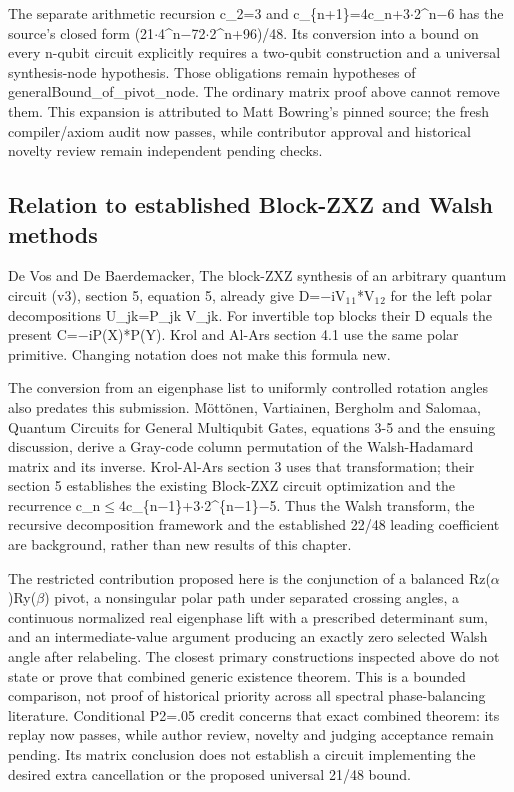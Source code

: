 \documentclass[11pt,a4paper]{article}
\begin{document}
The separate arithmetic recursion c\_2=3 and c\_\{n+1\}=4c\_n+3\ensuremath{\cdot}2\textasciicircum{}n\ensuremath{-}6 has the source's closed form (21\ensuremath{\cdot}4\textasciicircum{}n\ensuremath{-}72\ensuremath{\cdot}2\textasciicircum{}n+96)/48. Its conversion into a bound on every n-qubit circuit explicitly requires a two-qubit construction and a universal synthesis-node hypothesis. Those obligations remain hypotheses of generalBound\_of\_pivot\_node. The ordinary matrix proof above cannot remove them. This expansion is attributed to Matt Bowring's pinned source; the fresh compiler/axiom audit now passes, while contributor approval and historical novelty review remain independent pending checks.

\subsection{Relation to established Block-ZXZ and Walsh methods}
De Vos and De Baerdemacker, The block-ZXZ synthesis of an arbitrary quantum circuit (v3), section 5, equation 5, already give D=\ensuremath{-}iV\ensuremath{_1}\ensuremath{_1}*V\ensuremath{_1}\ensuremath{_2} for the left polar decompositions U\_jk=P\_jk V\_jk. For invertible top blocks their D equals the present C=\ensuremath{-}iP(X)*P(Y). Krol and Al-Ars section 4.1 use the same polar primitive. Changing notation does not make this formula new.

The conversion from an eigenphase list to uniformly controlled rotation angles also predates this submission. Möttönen, Vartiainen, Bergholm and Salomaa, Quantum Circuits for General Multiqubit Gates, equations 3-5 and the ensuing discussion, derive a Gray-code column permutation of the Walsh-Hadamard matrix and its inverse. Krol-Al-Ars section 3 uses that transformation; their section 5 establishes the existing Block-ZXZ circuit optimization and the recurrence c\_n\ensuremath{\leq}4c\_\{n\ensuremath{-}1\}+3\ensuremath{\cdot}2\textasciicircum{}\{n\ensuremath{-}1\}\ensuremath{-}5. Thus the Walsh transform, the recursive decomposition framework and the established 22/48 leading coefficient are background, rather than new results of this chapter.

The restricted contribution proposed here is the conjunction of a balanced Rz(\ensuremath{\alpha})Ry(\ensuremath{\beta}) pivot, a nonsingular polar path under separated crossing angles, a continuous normalized real eigenphase lift with a prescribed determinant sum, and an intermediate-value argument producing an exactly zero selected Walsh angle after relabeling. The closest primary constructions inspected above do not state or prove that combined generic existence theorem. This is a bounded comparison, not proof of historical priority across all spectral phase-balancing literature. Conditional P2=.05 credit concerns that exact combined theorem: its replay now passes, while author review, novelty and judging acceptance remain pending. Its matrix conclusion does not establish a circuit implementing the desired extra cancellation or the proposed universal 21/48 bound.
\end{document}
